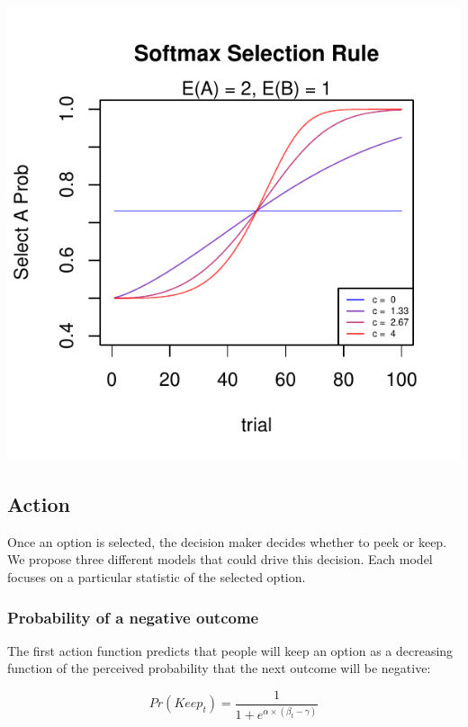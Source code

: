 \documentclass[a4paper,doc,natbib,floatsintext]{apa6}\usepackage[]{graphicx}\usepackage[]{color}
\makeatletter
\def\maxwidth{ %
  \ifdim\Gin@nat@width>\linewidth
    \linewidth
  \else
    \Gin@nat@width
  \fi
}
\newenvironment{knitrout}{}{} %
\makeatother
\begin{document}
\begin{knitrout}
\color{fgcolor}
\includegraphics[width=\maxwidth]{figure/unnamed-chunk-2-1} 

\end{knitrout}


\subsection{Action}

Once an option is selected, the decision maker decides whether to peek or keep. We propose three different models that could drive this decision. Each model focuses on a particular statistic of the selected option.

\subsubsection{Probability of a negative outcome}

The first action function predicts that people will keep an option as a decreasing function of the perceived probability that the next outcome will be negative:

\begin{center}
\begin{equation}
\label{eq:actionpneg}

Pr(Keep_{t})= \frac{1}{1 + e^{\alpha \times (\beta_{t} - \gamma)}}

\end{equation}
\end{center}
\end{document}
